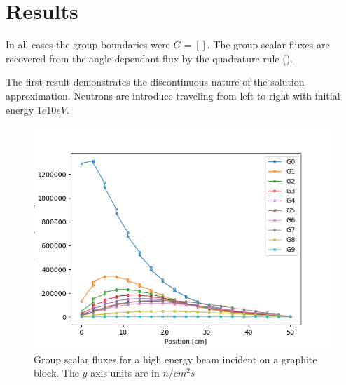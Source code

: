 \section{Results}

In all cases the group boundaries were $G = []$.
The group scalar fluxes are recovered from the angle-dependant flux by the quadrature rule ().

The first result demonstrates the discontinuous nature of the solution approximation.  Neutrons are introduce traveling from left to right with initial energy $1e10eV$.

\begin{figure}[!htbp]
\centering
\includegraphics[width=12cm]{results/scflux_graphite_beam_1.png}
\caption{Group scalar fluxes for a high energy beam incident on a graphite block. The $y$ axis units are in $n/cm^2s$}
\label{single_ele}
\end{figure}